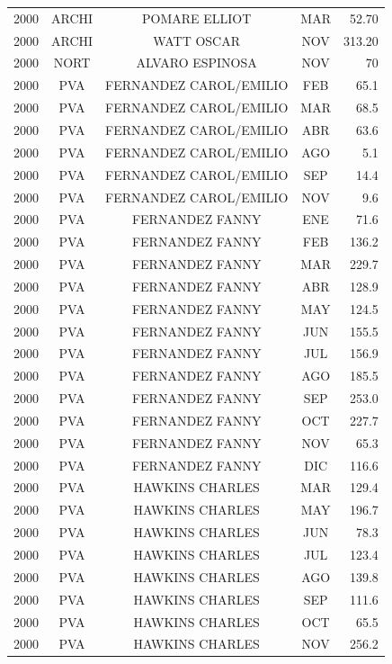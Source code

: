 \documentclass[12pt,]{article}
\begin{document}
\begin{table}[ht]
{\begin{tabular}{lcccr}
  2000 & ARCHI & POMARE ELLIOT & MAR & 52.70 \\ 
  2000 & ARCHI & WATT OSCAR & NOV & 313.20 \\ 
  2000 & NORT & ALVARO ESPINOSA & NOV & 70 \\ 
  2000 & PVA & FERNANDEZ CAROL/EMILIO & FEB & 65.1 \\ 
  2000 & PVA & FERNANDEZ CAROL/EMILIO & MAR & 68.5 \\ 
  2000 & PVA & FERNANDEZ CAROL/EMILIO & ABR & 63.6 \\ 
  2000 & PVA & FERNANDEZ CAROL/EMILIO & AGO & 5.1 \\ 
  2000 & PVA & FERNANDEZ CAROL/EMILIO & SEP & 14.4 \\ 
  2000 & PVA & FERNANDEZ CAROL/EMILIO & NOV & 9.6 \\ 
  2000 & PVA & FERNANDEZ FANNY & ENE & 71.6 \\ 
  2000 & PVA & FERNANDEZ FANNY & FEB & 136.2 \\ 
  2000 & PVA & FERNANDEZ FANNY & MAR & 229.7 \\ 
  2000 & PVA & FERNANDEZ FANNY & ABR & 128.9 \\ 
  2000 & PVA & FERNANDEZ FANNY & MAY & 124.5 \\ 
  2000 & PVA & FERNANDEZ FANNY & JUN & 155.5 \\ 
  2000 & PVA & FERNANDEZ FANNY & JUL & 156.9 \\ 
  2000 & PVA & FERNANDEZ FANNY & AGO & 185.5 \\ 
  2000 & PVA & FERNANDEZ FANNY & SEP & 253.0 \\ 
  2000 & PVA & FERNANDEZ FANNY & OCT & 227.7 \\ 
  2000 & PVA & FERNANDEZ FANNY & NOV & 65.3 \\ 
  2000 & PVA & FERNANDEZ FANNY & DIC & 116.6 \\ 
  2000 & PVA & HAWKINS CHARLES & MAR & 129.4 \\ 
  2000 & PVA & HAWKINS CHARLES & MAY & 196.7 \\ 
  2000 & PVA & HAWKINS CHARLES & JUN & 78.3 \\ 
  2000 & PVA & HAWKINS CHARLES & JUL & 123.4 \\ 
  2000 & PVA & HAWKINS CHARLES & AGO & 139.8 \\ 
  2000 & PVA & HAWKINS CHARLES & SEP & 111.6 \\ 
  2000 & PVA & HAWKINS CHARLES & OCT & 65.5 \\ 
  2000 & PVA & HAWKINS CHARLES & NOV & 256.2 \\ 

\end{tabular}}
\end{table}
\end{document}
